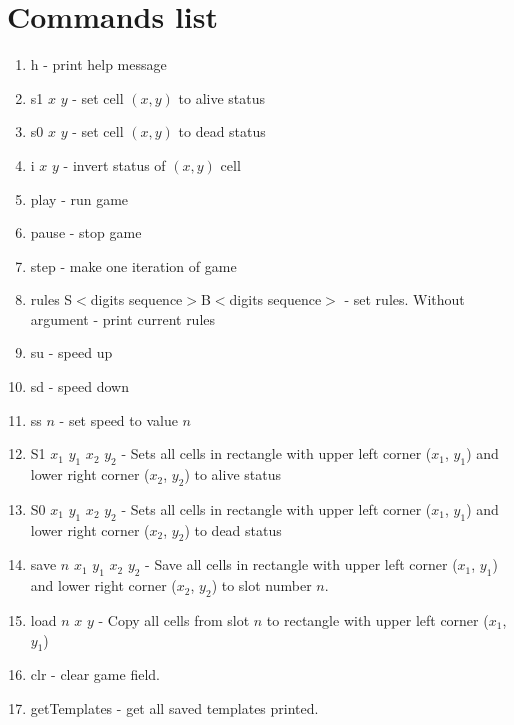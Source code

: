 \section*{Commands list}

\begin{enumerate}
	\item \textsf{h} - print help message
	\item \textsf{s1 $x$ $y$} - set cell $(x, y)$ to alive status
	\item \textsf{s0 $x$ $y$} - set cell $(x, y)$ to dead status
	\item \textsf{i $x$ $y$} - invert status of $(x, y)$ cell
	\item \textsf{play} - run game
	\item \textsf{pause} - stop game
	\item \textsf{step} - make one iteration of game
	\item \textsf{rules S$<$digits sequence$>$B$<$digits sequence$>$} - set rules. Without argument - print current rules
	\item \textsf{su} - speed up
	\item \textsf{sd} - speed down
	\item \textsf{ss $n$} - set speed to value $n$
	\item \textsf{S1 $x_{1}$ $y_{1}$ $x_{2}$ $y_{2}$} -  Sets all cells in rectangle with upper left corner ($x_{1}$, $y_{1}$) and lower right corner ($x_{2}$, $y_{2}$) to alive status
	\item \textsf{S0 $x_{1}$ $y_{1}$ $x_{2}$ $y_{2}$} -  Sets all cells in rectangle with upper left corner ($x_{1}$, $y_{1}$) and lower right corner ($x_{2}$, $y_{2}$) to dead status
	\item \textsf{save $n$ $x_{1}$ $y_{1}$ $x_{2}$ $y_{2}$} - Save all cells in rectangle with upper left corner ($x_{1}$, $y_{1}$) and lower right corner ($x_{2}$, $y_{2}$) to slot number $n$.
	\item \textsf{load $n$ $x$ $y$} - Copy all cells from slot $n$ to rectangle with upper left corner ($x_{1}$, $y_{1}$)
	\item \textsf{clr} - clear game field.
	\item \textsf{getTemplates} - get all saved templates printed.
\end{enumerate}
